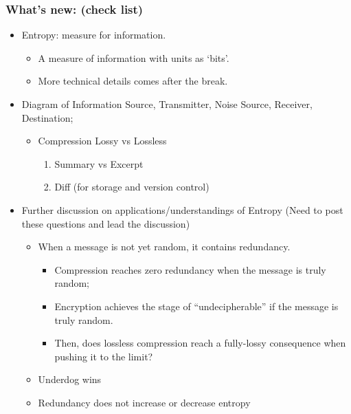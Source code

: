 \documentclass[12pt]{article}
\theoremstyle{definition}
\theoremstyle{plain}
\begin{document}
\subsubsection{What's new: (check list)}
\begin{itemize}
    \item Entropy: measure for information.
        \begin{itemize}
            \item A measure of information with units as `bits'.
            \item More technical details comes after the break. %

        \end{itemize}
    \item Diagram of Information Source, Transmitter, Noise Source, Receiver,
        Destination;
        \begin{itemize}
            \item Compression Lossy vs Lossless
                \begin{enumerate}
                    \item  Summary vs Excerpt
                    \item Diff (for storage and version control)
                \end{enumerate}
        \end{itemize}
    \item Further discussion on applications/understandings of Entropy (Need to
        post these questions and lead the discussion)
        \newpage
        \begin{itemize}
            \item When a message is not yet random, it contains redundancy.
                \begin{itemize}
                    \item Compression reaches zero redundancy when the message
                        is truly random;
                    \item Encryption achieves the stage of ``undecipherable'' if
                        the message is truly random.
                    \item Then, does lossless compression reach a fully-lossy
                        consequence when pushing it to the limit?
                \end{itemize}
            \item {Underdog wins}
            \item {Redundancy does not increase or decrease entropy}

\end{itemize}
\end{itemize}
\end{document}
